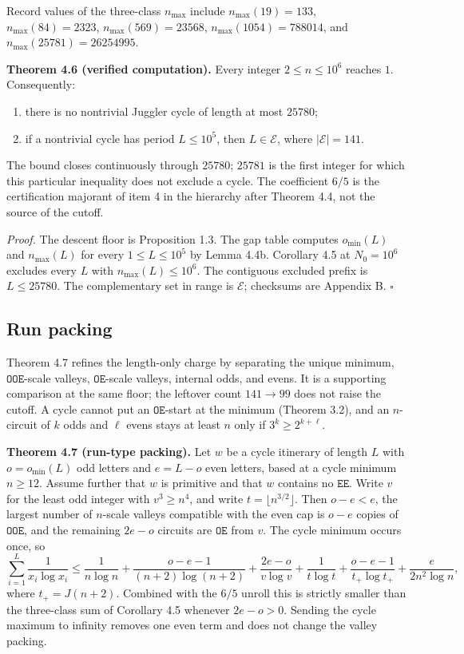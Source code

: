 \documentclass[12pt]{article}
\begin{document}
Record values of the three-class \(n_{\max}\) include
\(n_{\max}(19)=133\), \(n_{\max}(84)=2323\), \(n_{\max}(569)=23568\),
\(n_{\max}(1054)=788014\), and \(n_{\max}(25781)=26254995\).

\textbf{Theorem 4.6 (verified computation).} Every integer
\(2\le n\le 10^6\) reaches \(1\). Consequently:

\begin{enumerate}
\def\labelenumi{(\Alph{enumi})}
\item
  there is no nontrivial Juggler cycle of length at most \(25780\);
\item
  if a nontrivial cycle has period \(L\le 10^5\), then
  \(L\in\mathcal E\), where \(\lvert\mathcal E\rvert=141\).
\end{enumerate}

The bound closes continuously through \(25780\); \(25781\) is the first
integer for which this particular inequality does not exclude a cycle.
The coefficient \(6/5\) is the certification majorant of item 4 in the
hierarchy after Theorem 4.4, not the source of the cutoff.

\emph{Proof.} The descent floor is Proposition 1.3. The gap table
computes \(o_{\min}(L)\) and \(n_{\max}(L)\) for every
\(1\le L\le 10^5\) by Lemma 4.4b. Corollary 4.5 at \(N_0=10^6\) excludes
every \(L\) with \(n_{\max}(L)\le 10^6\). The contiguous excluded prefix
is \(L\le 25780\). The complementary set in range is \(\mathcal E\);
checksums are Appendix B. \(\square\)

\subsection{Run packing}\label{run-packing}

Theorem 4.7 refines the length-only charge by separating the unique
minimum, \(\mathtt{OOE}\)-scale valleys, \(\mathtt{OE}\)-scale valleys,
internal odds, and evens. It is a supporting comparison at the same
floor; the leftover count \(141\to 99\) does not raise the cutoff. A
cycle cannot put an \(\mathtt{OE}\)-start at the minimum (Theorem 3.2),
and an \(n\)-circuit of \(k\) odds and \(\ell\) evens stays at least
\(n\) only if \(3^k\ge 2^{k+\ell}\).

\textbf{Theorem 4.7 (run-type packing).} Let \(w\) be a cycle itinerary
of length \(L\) with \(o=o_{\min}(L)\) odd letters and \(e=L-o\) even
letters, based at a cycle minimum \(n\ge 12\). Assume further that \(w\)
is primitive and that \(w\) contains no \(\mathtt{EE}\). Write \(v\) for
the least odd integer with \(v^3\ge n^4\), and write
\(t=\lfloor n^{3/2}\rfloor\). Then \(o-e<e\), the largest number of
\(n\)-scale valleys compatible with the even cap is \(o-e\) copies of
\(\mathtt{OOE}\), and the remaining \(2e-o\) circuits are
\(\mathtt{OE}\) from \(v\). The cycle minimum occurs once, so \[
\sum_{i=1}^{L}\frac{1}{x_i\log x_i}
\le
\frac{1}{n\log n}
+\frac{o-e-1}{(n+2)\log(n+2)}
+\frac{2e-o}{v\log v}
+\frac{1}{t\log t}
+\frac{o-e-1}{t_+\log t_+}
+\frac{e}{2n^2\log n},
\] where \(t_+=J(n+2)\). Combined with the \(6/5\) unroll this is
strictly smaller than the three-class sum of Corollary 4.5 whenever
\(2e-o>0\). Sending the cycle maximum to infinity removes one even term
and does not change the valley packing.
\end{document}
